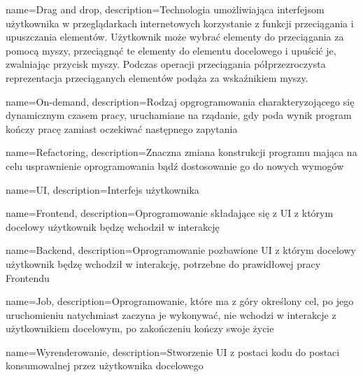 

{
    name={Drag and drop},
    description={Technologia umożliwiająca interfejsom użytkownika w przeglądarkach internetowych korzystanie z funkcji przeciągania i upuszczania elementów. Użytkownik może wybrać elementy do przeciągania za pomocą myszy, przeciągnąć te elementy do elementu docelowego i upuścić je, zwalniając przycisk myszy. Podczas operacji przeciągania półprzezroczysta reprezentacja przeciąganych elementów podąża za wskaźnikiem myszy.}
}

{
    name={On-demand},
    description={Rodzaj opgrogramowania charakteryzojącego się dynamicznym czasem pracy, uruchamiane na rządanie, gdy poda wynik program kończy pracę zamiast oczekiwać następnego zapytania}
}

{
    name={Refactoring},
    description={Znaczna zmiana konstrukcji programu mająca na celu usprawnienie oprogramowania bądź dostosowanie go do nowych wymogów}
}

{
    name={UI},
    description={Interfejs użytkownika}
}

{
    name={Frontend},
    description={Oprogramowanie składające się z UI z którym docelowy użytkownik będzę wchodził w interakcję}
}

{
    name={Backend},
    description={Oprogramowanie pozbawione UI z którym docelowy użytkownik będzę wchodził w interakcję, potrzebne do prawidłowej pracy Frontendu}
}

{
    name={Job},
    description={Oprogramowanie, które ma z góry określony cel, po jego uruchomieniu natychmiast zaczyna je wykonywać, nie wchodzi w interakcje z użytkownikiem docelowym, po zakończeniu kończy swoje życie}
}


{
    name={Wyrenderowanie},
    description={Stworzenie UI z postaci kodu do postaci konsumowalnej przez użytkownika docelowego}
}

